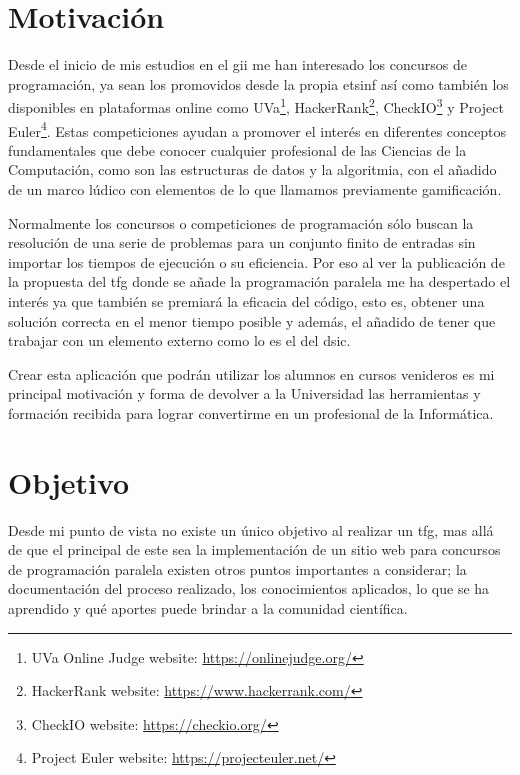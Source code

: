 \documentclass[11pt,spanish,listoffigures,listoftables]{tfgetsinf}
\begin{document}
\section{Motivación}

Desde el inicio de mis estudios en el \acrshort{gii} me han interesado los concursos de programación, ya sean los promovidos desde la propia \acrshort{etsinf} así como también los disponibles en plataformas online como UVa\footnote{UVa Online Judge website: \url{https://onlinejudge.org/}}, HackerRank\footnote{HackerRank website: \url{https://www.hackerrank.com/}}, CheckIO\footnote{CheckIO website: \url{https://checkio.org/}} y Project Euler\footnote{Project Euler website: \url{https://projecteuler.net/}}. Estas competiciones ayudan a promover el interés en diferentes conceptos fundamentales que debe conocer cualquier profesional de las Ciencias de la Computación, como son las estructuras de datos y la algoritmia, con el añadido de un marco lúdico con elementos de lo que llamamos previamente gamificación. \par

Normalmente los concursos o competiciones de programación sólo buscan la resolución de una serie de problemas para un conjunto finito de entradas sin importar los tiempos de ejecución o su eficiencia. Por eso al ver la publicación de la propuesta del \acrfull{tfg} donde se añade la programación paralela me ha despertado el interés ya que también se premiará la eficacia del código, esto es, obtener una solución correcta en el menor tiempo posible y además, el añadido de tener que trabajar con un elemento externo como lo es el  \kahan del \acrfull{dsic}.  \par

Crear esta aplicación que podrán utilizar los alumnos en cursos venideros es mi principal motivación y forma de devolver a la Universidad las herramientas y formación recibida para lograr convertirme en un profesional de la Informática. 

\section{Objetivo}

Desde mi punto de vista no existe un único objetivo al realizar un \acrshort{tfg}, mas allá de que el principal de este sea la implementación de un sitio web para concursos de programación paralela existen otros puntos importantes a considerar; la documentación del proceso realizado, los conocimientos aplicados, lo que se ha aprendido y qué aportes puede brindar a la comunidad científica. \par 
\end{document}
